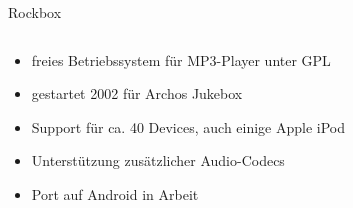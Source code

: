 \documentclass[t]{beamer}
\begin{document}
\begin{frame}{Rockbox}
    \begin{columns}[T]
        \begin{column}{0.45\textwidth}
            \begin{itemize}
                \item freies Betriebssystem für MP3-Player unter GPL
                \item gestartet 2002 für Archos Jukebox
                \item Support für ca. 40 Devices, auch einige Apple iPod
                \item Unterstützung zusätzlicher Audio-Codecs
                \item Port auf Android in Arbeit
            \end{itemize}
        \end{column}
        \begin{column}{0.5\textwidth}
        \end{column}
    \end{columns}
\end{frame}
\end{document}
